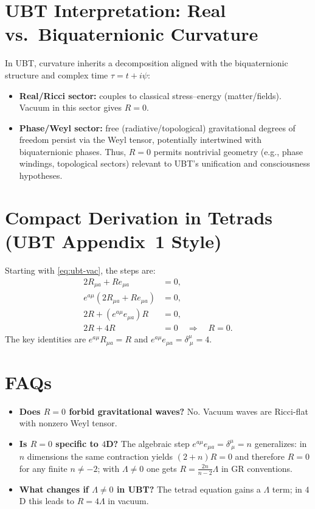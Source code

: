 \documentclass[12pt]{article}
\begin{document}
\section{UBT Interpretation: Real vs.\ Biquaternionic Curvature}
In UBT, curvature inherits a decomposition aligned with the biquaternionic structure and complex time $\tau=t+i\psi$:
\begin{itemize}[leftmargin=2em]
\item \textbf{Real/Ricci sector:} couples to classical stress--energy (matter/fields). Vacuum in this sector gives $R=0$.
\item \textbf{Phase/Weyl sector:} free (radiative/topological) gravitational degrees of freedom persist via the Weyl tensor, potentially intertwined with biquaternionic phases. Thus, $R=0$ permits nontrivial geometry (e.g., phase windings, topological sectors) relevant to UBT's unification and consciousness hypotheses.
\end{itemize}

\section{Compact Derivation in Tetrads (UBT Appendix~1 Style)}
Starting with \eqref{eq:ubt-vac}, the steps are:
\begin{align}
2R_{\mu a} + R e_{\mu a} &= 0,\\
e^{a\mu}(2R_{\mu a} + R e_{\mu a}) &= 0,\\
2R + (e^{a\mu}e_{\mu a})R &= 0,\\
2R + 4R &= 0 \quad \Rightarrow \quad R=0.
\end{align}
The key identities are $e^{a\mu}R_{\mu a}=R$ and $e^{a\mu}e_{\mu a}=\delta^\mu_{\ \mu}=4$.

\section{FAQs}
\begin{itemize}[leftmargin=2em]
\item \textbf{Does $R=0$ forbid gravitational waves?} No. Vacuum waves are Ricci-flat with nonzero Weyl tensor.
\item \textbf{Is $R=0$ specific to $4$D?} The algebraic step $e^{a\mu}e_{\mu a}=\delta^\mu_{\ \mu}=n$ generalizes: in $n$ dimensions the same contraction yields $(2+n)R=0$ and therefore $R=0$ for any finite $n\neq -2$; with $\Lambda\neq 0$ one gets $R=\tfrac{2n}{n-2}\Lambda$ in GR conventions.
\item \textbf{What changes if $\Lambda\neq 0$ in UBT?} The tetrad equation gains a $\Lambda$ term; in $4$D this leads to $R=4\Lambda$ in vacuum.
\end{itemize}
\end{document}
